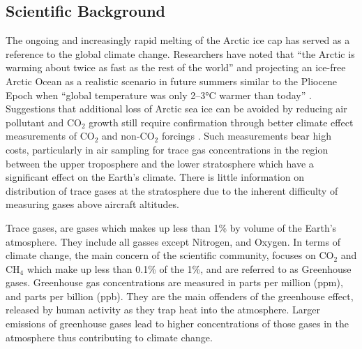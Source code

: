 \subsection{Scientific Background}

The ongoing and increasingly rapid melting of the Arctic ice cap has served as a reference to the global climate change. Researchers have noted that \enquote{the Arctic is warming about twice as fast as the rest of the world} \cite{Perkins} and projecting an ice-free Arctic Ocean as a realistic scenario in future summers similar to the Pliocene Epoch when \enquote{global temperature was only 2–3°C warmer than today} \cite{Trace}. Suggestions that additional loss of Arctic sea ice can be avoided by reducing air pollutant and CO$_{2}$ growth still require confirmation through better climate effect measurements of CO$_{2}$ and non-CO$_{2}$ forcings \cite{Trace}. Such measurements bear high costs, particularly in air sampling for trace gas concentrations in the region between the upper troposphere and the lower stratosphere which have a significant effect on the Earth's climate. There is little information on distribution of trace gases at the stratosphere due to the inherent difficulty of measuring gases above aircraft altitudes.

Trace gases, are gases which makes up less than 1\% by volume of the Earth's atmosphere. They include all gasses except Nitrogen, and Oxygen. In terms of climate change, the main concern of the scientific community, focuses on CO$_2$ and CH$_4$ which make up less than 0.1\% of the 1\%, and are referred to as Greenhouse gases. Greenhouse gas concentrations are measured in parts per million (ppm), and parts per billion (ppb). They are the main offenders of the greenhouse effect, released by human activity as they trap heat into the atmosphere. Larger emissions of greenhouse gases lead to higher concentrations of those gases in the atmosphere thus contributing to climate change.
